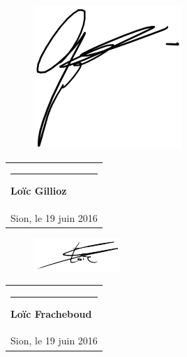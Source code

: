 \documentclass[a4paper,10pt]{article}
\newcommand{\signature}[2]{%
  \par\nobreak\bigskip
  \begin{singlespace}%
  \mbox{}\hfill\begin{tabular}{p{8cm} }
      \rule{8cm}{0.5pt}\newline{}%
        \textbf{#1}\\%
       #2 %
  \end{tabular}%
  \end{singlespace}%
  \medskip%
 }
\begin{document}
 \vspace{30pt}
 \begin{figure}
 \vspace{-52pt}
 \centering
 \includegraphics[scale=0.5]{signgillioz}
 \end{figure}
 \signature{Loïc Gillioz}{Sion, le 19 juin 2016} 
 
 \begin{figure}
 \vspace{-52pt}
 \centering
 \includegraphics[scale=1]{signfracheboud}
 \end{figure}
 \signature{Loïc Fracheboud}{Sion, le 19 juin 2016} 
 
\end{document}
